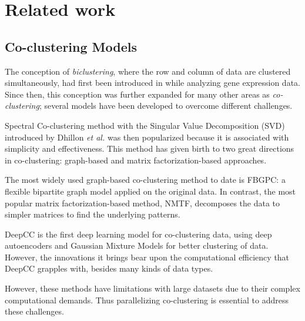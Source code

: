 

\section{Related work}
\label{sec:related_work}
\subsection{Co-clustering Models}

The conception of \emph{biclustering}, where the row and column of data are clustered simultaneously, had first been introduced in\cite{hartigan1972DirectClusteringData} while analyzing gene expression data. Since then, this conception was further expanded for many other areas as \emph{co-clustering}; several models have been developed to overcome different challenges.

Spectral Co-clustering method with the Singular Value Decomposition (SVD) introduced by  Dhillon \textit{et al.} \cite{dhillon2001CoclusteringDocumentsWords} was then popularized because it is associated with simplicity and effectiveness. This method has given birth to two great directions in co-clustering: graph-based and matrix factorization-based approaches. 

The most widely used graph-based co-clustering method to date is FBGPC\cite{chen2023FastFlexibleBipartitea}: a flexible bipartite graph model applied on the original data. In contrast, the most popular matrix factorization-based method, NMTF\cite{long2005CoclusteringBlockValue}, decomposes the data to simpler matrices to find the underlying patterns. 

DeepCC\cite{dongkuanxu2019DeepCoClustering} is the first deep learning model for co-clustering data, using deep autoencoders and Gaussian Mixture Models for better clustering of data. However, the innovations it brings bear upon the computational efficiency that DeepCC grapples with, besides many kinds of data types. 

However, these methods have limitations with large datasets due to their complex computational demands. Thus parallelizing co-clustering is essential to address these challenges.

